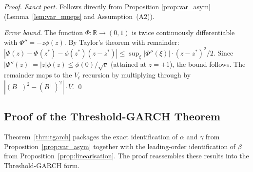 \documentclass[12pt,a4paper]{article}
\theoremstyle{definition}
\begin{document}
\begin{proof}
\textit{Exact part.} Follows directly from Proposition
\ref{prop:var_asym} (Lemma~\ref{lem:var_mueps} and
Assumption~(A2)).

\textit{Error bound.} The function $\Phi: \mathbb{R} \to (0,1)$
is twice continuously differentiable with $\Phi'' =
-z\phi(z)$. By Taylor's theorem with remainder:
$|\Phi(z) - \Phi(z^*) - \phi(z^*)(z-z^*)| \leq
\sup_\xi|\Phi''(\xi)| \cdot (z-z^*)^2/2$. Since
$|\Phi''(z)| = |z|\phi(z) \leq \phi(0)/\sqrt{e}$ (attained at
$z = \pm 1$), the bound follows. The remainder maps to the
$V_t$ recursion by multiplying through by $|(B^-)^2 -
(B^+)^2|\cdot\bar{V}$.
\qed
\end{proof}

\subsection{Proof of the Threshold-GARCH Theorem}
\label{app:tgarch_proof}

Theorem~\ref{thm:tgarch} packages the exact identification of $\alpha$
and $\gamma$ from Proposition~\ref{prop:var_asym} together with the
leading-order identification of $\beta$ from
Proposition~\ref{prop:linearisation}. The proof reassembles these
results into the Threshold-GARCH form.
\end{document}
